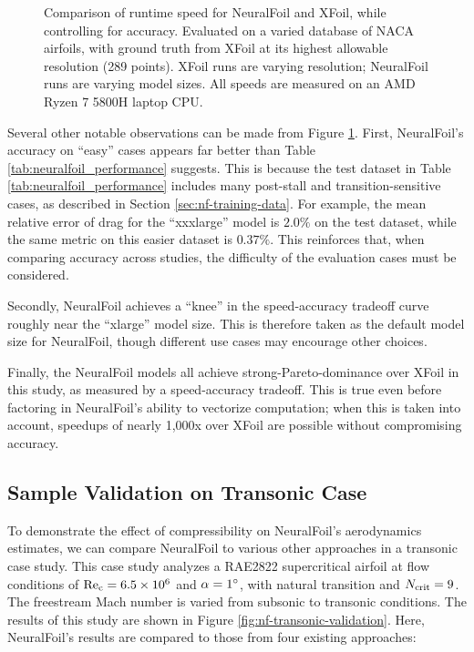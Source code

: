 \begin{figure}[H]
    \centering
    
    \caption{Comparison of runtime speed for NeuralFoil and XFoil, while controlling for accuracy. Evaluated on a varied database of NACA airfoils, with ground truth from XFoil at its highest allowable resolution (289 points). XFoil runs are varying resolution; NeuralFoil runs are varying model sizes. All speeds are measured on an AMD Ryzen 7 5800H laptop CPU.}
    \label{fig:nf-accuracy-speed}
\end{figure}

Several other notable observations can be made from Figure \ref{fig:nf-accuracy-speed}. First, NeuralFoil's accuracy on ``easy'' cases appears far better than Table \ref{tab:neuralfoil_performance} suggests. This is because the test dataset in Table \ref{tab:neuralfoil_performance} includes many post-stall and transition-sensitive cases, as described in Section \ref{sec:nf-training-data}. For example, the mean relative error of drag for the ``xxxlarge'' model is $2.0\%$ on the test dataset, while the same metric on this easier dataset is $0.37\%$. This reinforces that, when comparing accuracy across studies, the difficulty of the evaluation cases must be considered.

Secondly, NeuralFoil achieves a ``knee'' in the speed-accuracy tradeoff curve roughly near the ``xlarge'' model size. This is therefore taken as the default model size for NeuralFoil, though different use cases may encourage other choices.

Finally, the NeuralFoil models all achieve strong-Pareto-dominance over XFoil in this study, as measured by a speed-accuracy tradeoff. This is true even before factoring in NeuralFoil's ability to vectorize computation; when this is taken into account, speedups of nearly 1,000x over XFoil are possible without compromising accuracy.

\subsection{Sample Validation on Transonic Case}
\label{sec:nf-validation-transonic}

To demonstrate the effect of compressibility on NeuralFoil's aerodynamics estimates, we can compare NeuralFoil to various other approaches in a transonic case study. This case study analyzes a RAE2822 supercritical airfoil at flow conditions of $\rm Re_c=6.5 \times 10^6$ and $\alpha=1\degree$, with natural transition and $N_{\rm crit}=9$. The freestream Mach number is varied from subsonic to transonic conditions. The results of this study are shown in Figure \ref{fig:nf-transonic-validation}. Here, NeuralFoil's results are compared to those from four existing approaches:

